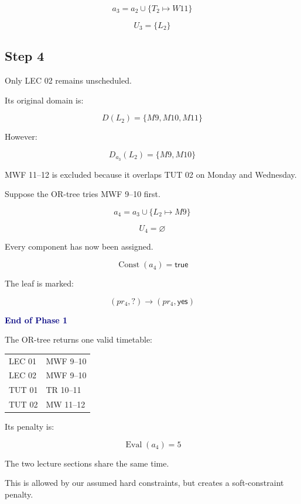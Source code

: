 \documentclass[11pt,letterpaper]{article}
\newcommand{\yes}{\mathsf{yes}}
\newcommand{\ask}{\mathord{?}}
\newcommand{\Const}{\operatorname{Const}}
\newcommand{\Eval}{\operatorname{Eval}}
\newcommand{\key}[1]{
    \textcolor{navy}{\bfseries #1}
}
\begin{document}
\begin{equation}
a_3=a_2\cup\{T_2\mapsto W11\}
\end{equation}

\begin{equation}
U_3=\{L_2\}
\end{equation}

\subsection{Step 4}

Only LEC 02 remains unscheduled.

Its original domain is:

\begin{equation}
D(L_2)=\{M9,M10,M11\}
\end{equation}

However:

\begin{equation}
\boxed{
D_{a_3}(L_2)=\{M9,M10\}
}
\end{equation}

MWF 11--12 is excluded because it
overlaps TUT 02 on Monday and Wednesday.

Suppose the OR-tree tries MWF 9--10 first.

\begin{equation}
a_4=a_3\cup\{L_2\mapsto M9\}
\end{equation}

\begin{equation}
\boxed{
U_4=\varnothing
}
\end{equation}

Every component has now been assigned.

\begin{equation}
\boxed{
\Const(a_4)=\mathsf{true}
}
\end{equation}

The leaf is marked:

\begin{equation}
(pr_4,\ask)\rightarrow(pr_4,\yes)
\end{equation}

\begin{goodbox}
\key{End of Phase 1}

The OR-tree returns one valid timetable:

\begin{center}
\begin{tabular}{ll}
LEC 01 & MWF 9--10\\
LEC 02 & MWF 9--10\\
TUT 01 & TR 10--11\\
TUT 02 & MW 11--12
\end{tabular}
\end{center}

Its penalty is:

\[
\boxed{\Eval(a_4)=5}
\]

The two lecture sections share the same time.

This is allowed by our assumed hard constraints,
but creates a soft-constraint penalty.
\end{goodbox}
\end{document}
